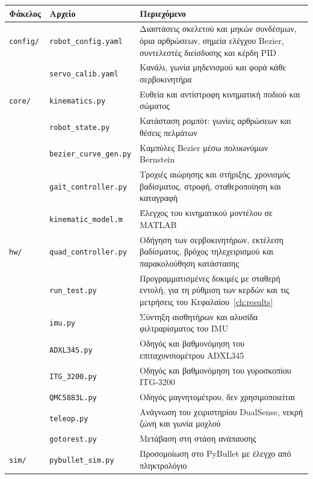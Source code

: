 \documentclass[11pt]{report}
\begin{document}
\begin{table}[htbp]
    \centering
    \small
    \begin{tabular}{@{}l l p{7.8cm}@{}}
        \toprule
        Φάκελος & Αρχείο & Περιεχόμενο \\
        \midrule
        \texttt{config/} & \texttt{robot\_config.yaml} & Διαστάσεις σκελετού και μηκών συνδέσμων, όρια αρθρώσεων, σημεία ελέγχου Bezier, συντελεστές διείσδυσης και κέρδη PID \\
        & \texttt{servo\_calib.yaml} & Κανάλι, γωνία μηδενισμού και φορά κάθε σερβοκινητήρα \\
        \midrule
        \texttt{core/} & \texttt{kinematics.py} & Ευθεία και αντίστροφη κινηματική ποδιού και σώματος \\
        & \texttt{robot\_state.py} & Κατάσταση ρομπότ: γωνίες αρθρώσεων και θέσεις πελμάτων \\
        & \texttt{bezier\_curve\_gen.py} & Καμπύλες Bezier μέσω πολυωνύμων Bernstein \\
        & \texttt{gait\_controller.py} & Τροχιές αιώρησης και στήριξης, χρονισμός βαδίσματος, στροφή, σταθεροποίηση και καταγραφή \\
        & \texttt{kinematic\_model.m} & Έλεγχος του κινηματικού μοντέλου σε MATLAB \\
        \midrule
        \texttt{hw/} & \texttt{quad\_controller.py} & Οδήγηση των σερβοκινητήρων, εκτέλεση βαδίσματος, βρόχος τηλεχειρισμού και παρακολούθηση κατάστασης \\
        & \texttt{run\_test.py} & Προγραμματισμένες δοκιμές με σταθερή εντολή, για τη ρύθμιση των κερδών και τις μετρήσεις του Κεφαλαίου~\ref{ch:results} \\
        & \texttt{imu.py} & Σύντηξη αισθητήρων και αλυσίδα φιλτραρίσματος του IMU \\
        & \texttt{ADXL345.py} & Οδηγός και βαθμονόμηση του επιταχυνσιομέτρου ADXL345 \\
        & \texttt{ITG\_3200.py} & Οδηγός και βαθμονόμηση του γυροσκοπίου ITG-3200 \\
        & \texttt{QMC5883L.py} & Οδηγός μαγνητομέτρου, δεν χρησιμοποιείται \\
        & \texttt{teleop.py} & Ανάγνωση του χειριστηρίου DualSense, νεκρή ζώνη και γωνία μοχλού \\
        & \texttt{gotorest.py} & Μετάβαση στη στάση ανάπαυσης \\
        \midrule
        \texttt{sim/} & \texttt{pybullet\_sim.py} & Προσομοίωση στο PyBullet με έλεγχο από πληκτρολόγιο \\

\end{tabular}
\end{table}
\end{document}
